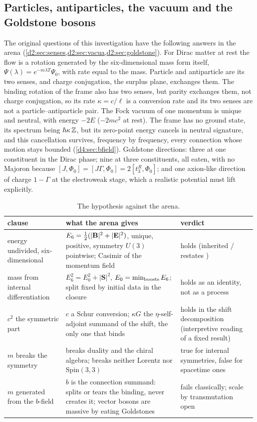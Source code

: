 \subsection{Particles, antiparticles, the vacuum and the Goldstone bosons}

The original questions of this investigation have the following answers in the arena (\cref{d2:sec:senses,d2:sec:vacua,d2:sec:goldstone}).
For Dirac matter at rest the flow is a rotation generated by the six-dimensional mass form itself, $\Psi(\lambda)=e^{-m\lambda T}\Psi_0$, with
rate equal to the mass. Particle and antiparticle are its two senses, and charge conjugation, the surplus plane, exchanges them. The binding
rotation of the frame also has two senses, but parity exchanges them, not charge conjugation, so its rate $\kappa=c/\ell$ is a conversion rate
and its two senses are not a particle--antiparticle pair. The Fock vacuum of one momentum is unique and neutral, with energy $-2E$
($-2mc^2$ at rest). The frame has no ground state, its spectrum being $\hbar\kappa\,\mathbb{Z}$, but its zero-point energy cancels in neutral
signature, and this cancellation survives, frequency by frequency, every connection whose motion stays bounded (\cref{d4:sec:bfield}).
Goldstone directions: three at one constituent in the Dirac phase; nine at three constituents, all eaten, with no Majoron because
$[J,\Phi_0]=[J\Gamma,\Phi_0]=2[t^R_3,\Phi_0]$; and one axion-like direction of charge $1-\Gamma$ at the electroweak stage, which a realistic
potential must lift explicitly.

\begin{table}[t]
\centering
\small
\begin{tabular}{@{}>{\raggedright\arraybackslash}p{3.6cm}>{\raggedright\arraybackslash}p{6.6cm}>{\raggedright\arraybackslash}p{4.0cm}@{}}
\toprule
clause & what the arena gives & verdict\\
\midrule
energy undivided, six-dimensional & $E_6=\tfrac12(|\mathbf B|^2+|\mathbf E|^2)$, unique, positive, symmetry $U(3)$ pointwise; Casimir of the momentum field &
holds (inherited / restates \cite{ES17})\\
mass from internal differentiation & $E_6^2=E_0^2+|\mathbf S|^2$, $E_0=\min_{\rm boosts}E_6$; split fixed by initial data in the closure &
holds as an identity, not as a process\\
$c^2$ the symmetric part & $c$ a Schur conversion; $\kappa G$ the $\eta$-self-adjoint summand of the shift, the only one that binds &
holds in the shift decomposition (interpretive reading of a fixed result)\\
$m$ breaks the symmetry & breaks duality and the chiral algebra; breaks neither Lorentz nor $\mathrm{Spin}(3,3)$ & true for internal symmetries,
false for spacetime ones\\
$m$ generated from the $b$-field & $b$ is the connection summand: splits or tears the binding, never creates it; vector bosons are massive by
eating Goldstones & fails classically; scale by transmutation open\\
\bottomrule
\end{tabular}
\caption{The hypothesis against the arena.}
\label{s5:tab:verdict}
\end{table}

